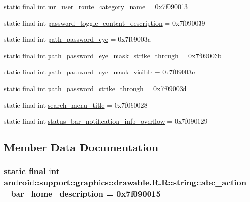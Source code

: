\begin{CompactItemize}
\item 
static final int \hyperlink{classandroid_1_1support_1_1graphics_1_1drawable_1_1_r_1_1string_f629409ea6e8f5540755eaaa0b36f7cf}{mr\_\-user\_\-route\_\-category\_\-name} = 0x7f090013
\item 
static final int \hyperlink{classandroid_1_1support_1_1graphics_1_1drawable_1_1_r_1_1string_d8a6dd4a13951a31a95face96d410490}{password\_\-toggle\_\-content\_\-description} = 0x7f090039
\item 
static final int \hyperlink{classandroid_1_1support_1_1graphics_1_1drawable_1_1_r_1_1string_6cdc4166577297bbc403bb70d4beeff2}{path\_\-password\_\-eye} = 0x7f09003a
\item 
static final int \hyperlink{classandroid_1_1support_1_1graphics_1_1drawable_1_1_r_1_1string_024dd0028fdef328ae81d47c2c22e64f}{path\_\-password\_\-eye\_\-mask\_\-strike\_\-through} = 0x7f09003b
\item 
static final int \hyperlink{classandroid_1_1support_1_1graphics_1_1drawable_1_1_r_1_1string_41f0068d6eb2469ab18706926f6fbe2f}{path\_\-password\_\-eye\_\-mask\_\-visible} = 0x7f09003c
\item 
static final int \hyperlink{classandroid_1_1support_1_1graphics_1_1drawable_1_1_r_1_1string_59a406ce40222dd49374134d7776aaf8}{path\_\-password\_\-strike\_\-through} = 0x7f09003d
\item 
static final int \hyperlink{classandroid_1_1support_1_1graphics_1_1drawable_1_1_r_1_1string_a8d079a41d885cc175f79604dd427f0c}{search\_\-menu\_\-title} = 0x7f090028
\item 
static final int \hyperlink{classandroid_1_1support_1_1graphics_1_1drawable_1_1_r_1_1string_e5c70804e36992ebb33bb45755eed553}{status\_\-bar\_\-notification\_\-info\_\-overflow} = 0x7f090029
\end{CompactItemize}


\subsection{Member Data Documentation}
\hypertarget{classandroid_1_1support_1_1graphics_1_1drawable_1_1_r_1_1string_d62e5f59b1262666d33e42a6736ab418}{
\subsubsection[{abc\_\-action\_\-bar\_\-home\_\-description}]{\setlength{\rightskip}{0pt plus 5cm}static final int android::support::graphics::drawable.R.R::string::abc\_\-action\_\-bar\_\-home\_\-description = 0x7f090015}}
\label{classandroid_1_1support_1_1graphics_1_1drawable_1_1_r_1_1string_d62e5f59b1262666d33e42a6736ab418}



